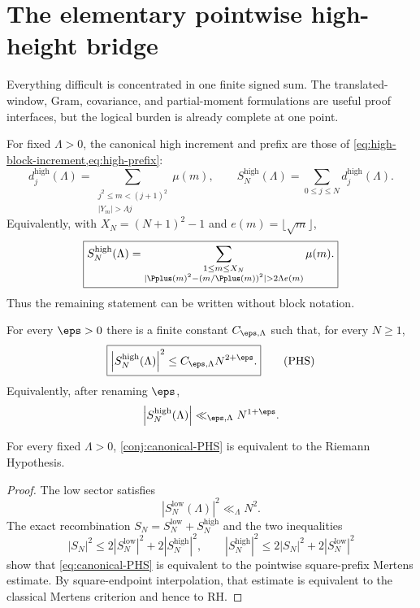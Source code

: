 \section{The elementary pointwise high-height bridge}
\label{sec:high-sector}

Everything difficult is concentrated in one finite signed sum.  The translated-window, Gram, covariance, and partial-moment formulations are useful proof interfaces, but the logical burden is already complete at one point.

For fixed $\Lambda>0$, the canonical high increment and prefix are those of \cref{eq:high-block-increment,eq:high-prefix}:
\[
 d_j^{\mathrm{high}}(\Lambda)
 =
 \sum_{\substack{j^2\le m<(j+1)^2\\|Y_m|>\Lambda j}}\mu(m),
 \qquad
 S_N^{\mathrm{high}}(\Lambda)
 =\sum_{0\le j\le N}d_j^{\mathrm{high}}(\Lambda).
\]
Equivalently, with $X_N=(N+1)^2-1$ and $e(m)=\lfloor\sqrt m\rfloor$,
\begin{equation}
 \boxed{
 S_N^{\mathrm{high}}(\Lambda)
 =
 \sum_{\substack{1\le m\le X_N\\
 |\Pplus(m)^2-(m/\Pplus(m))^2|>2\Lambda e(m)}}\mu(m).
 }
 \label{eq:high-single-finite-sum}
\end{equation}
Thus the remaining statement can be written without block notation.

\begin{conjecture}
\label{conj:canonical-PHS}
For every $\eps>0$ there is a finite constant $C_{\eps,\Lambda}$ such that, for every $N\ge1$,
\begin{equation}
 \boxed{
 \left|S_N^{\mathrm{high}}(\Lambda)\right|^2
 \le C_{\eps,\Lambda}N^{2+\eps}.
 }
 \tag{PHS}
 \label{eq:canonical-PHS}
\end{equation}
Equivalently, after renaming $\eps$,
\begin{equation}
 \left|S_N^{\mathrm{high}}(\Lambda)\right|
 \ll_{\eps,\Lambda}N^{1+\eps}.
 \label{eq:canonical-PHS-linear}
\end{equation}
\end{conjecture}

\begin{theorem}
\label{thm:canonical-PHS-iff-RH}
For every fixed $\Lambda>0$, \cref{conj:canonical-PHS} is equivalent to the Riemann Hypothesis.
\end{theorem}

\begin{proof}
The low sector satisfies
\[
 |S_N^{\mathrm{low}}(\Lambda)|^2
 \ll_\Lambda N^2.
\]
The exact recombination $S_N=S_N^{\mathrm{low}}+S_N^{\mathrm{high}}$ and the two inequalities
\[
 |S_N|^2\le2|S_N^{\mathrm{low}}|^2+2|S_N^{\mathrm{high}}|^2,
 \qquad
 |S_N^{\mathrm{high}}|^2\le2|S_N|^2+2|S_N^{\mathrm{low}}|^2
\]
show that \cref{eq:canonical-PHS} is equivalent to the pointwise square-prefix Mertens estimate.  By square-endpoint interpolation, that estimate is equivalent to the classical Mertens criterion and hence to RH.
\end{proof}

